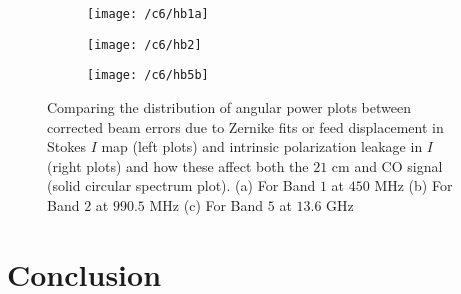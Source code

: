 \begin{figure}[H]
  \centering
     \begin{subfigure}{\columnwidth}
                \texttt{[image: /c6/hb1a]} %
                \caption{}
                \label{fig:H1}
        \end{subfigure} \hfill
        \begin{subfigure}{\columnwidth}
                \texttt{[image: /c6/hb2]} %
                \caption{}
               \label{fig:H2}
        \end{subfigure} \hfill
        \begin{subfigure}{\columnwidth}
                \texttt{[image: /c6/hb5b]} %
                \caption{}
               \label{fig:Co}
        \end{subfigure}
        
        \caption{Comparing the distribution of angular power plots between corrected beam errors due to Zernike fits or feed displacement
        in Stokes $I$ map (left plots) and  intrinsic polarization leakage in $I$ (right plots) and how these affect both the $21$ 
        cm and CO signal (solid circular spectrum plot). (a) For Band $1$ at $450$ MHz  (b) For Band $2$ at $990.5$ MHz  (c) For Band $5$ at $13.6$ GHz 
      }
	    \label{fig:HC}
  \end{figure}


\section{Conclusion} 


